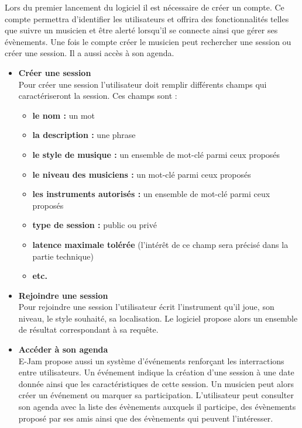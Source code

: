 \documentclass[a4,12pt]{article}
\begin{document}
Lors du premier lancement du logiciel il est nécessaire de créer un compte. Ce compte permettra d’identifier les utilisateurs et offrira des fonctionnalités telles que suivre un musicien et être alerté lorsqu’il se connecte ainsi que gérer ses évènements.
Une fois le compte créer le musicien peut rechercher une session ou créer une session. Il a aussi accès à son agenda.
\begin{itemize}
    \item \textbf{Créer une session} \\
    Pour créer une session l'utilisateur doit remplir différents champs qui caractériseront la session. Ces champs sont :
    \begin{itemize}
        \item \textbf{le nom :} un mot
        \item \textbf{la description :} une phrase
        \item \textbf{le style de musique :} un ensemble de mot-clé parmi ceux proposés
        \item \textbf{le niveau des musiciens :} un mot-clé parmi ceux proposés
        \item \textbf{les instruments autorisés :} un ensemble de mot-clé parmi ceux proposés
        \item \textbf{type de session :} public ou privé
        \item \textbf{latence maximale tolérée } (l'intérêt de ce champ sera précisé dans la partie technique)
        \item \textbf{etc.}
    \end{itemize}
    \item \textbf{Rejoindre une session}\\
    Pour rejoindre une session l’utilisateur écrit l’instrument qu’il joue, son niveau, le style souhaité, sa localisation. Le logiciel propose alors un ensemble de résultat correspondant à sa requête.
    \item \textbf{Accéder à son agenda}\\
    E-Jam propose aussi un système d’événements renforçant les interractions entre utilisateurs. Un événement indique la création d’une session à une date donnée ainsi que les caractéristiques de cette session. Un musicien peut alors créer un événement ou marquer sa participation. L’utilisateur peut consulter son agenda avec la liste des évènements auxquels il participe, des évènements proposé par ses amis ainsi que des évènements qui peuvent l'intéresser.\\

\end{itemize}
\end{document}
